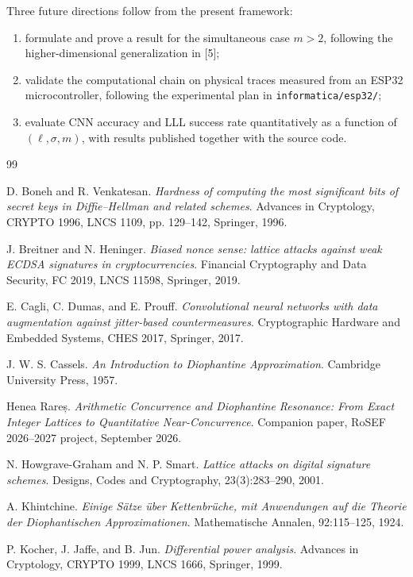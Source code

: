 \documentclass[11pt,a4paper]{article}
\begin{document}
Three future directions follow from the present framework:
\begin{enumerate}[label=(\alph*),leftmargin=2.5em]
\item formulate and prove a result for the simultaneous case $m>2$, following the higher-dimensional generalization in [5];
\item validate the computational chain on physical traces measured from an ESP32 microcontroller, following the experimental plan in \texttt{informatica/esp32/};
\item evaluate CNN accuracy and LLL success rate quantitatively as a function of $(\ell,\sigma,m)$, with results published together with the source code.
\end{enumerate}

\begin{thebibliography}{99}

D. Boneh and R. Venkatesan.
\emph{Hardness of computing the most significant bits of secret keys in Diffie--Hellman and related schemes}.
Advances in Cryptology, CRYPTO 1996, LNCS 1109, pp. 129--142, Springer, 1996.

J. Breitner and N. Heninger.
\emph{Biased nonce sense: lattice attacks against weak ECDSA signatures in cryptocurrencies}.
Financial Cryptography and Data Security, FC 2019, LNCS 11598, Springer, 2019.

E. Cagli, C. Dumas, and E. Prouff.
\emph{Convolutional neural networks with data augmentation against jitter-based countermeasures}.
Cryptographic Hardware and Embedded Systems, CHES 2017, Springer, 2017.

J. W. S. Cassels.
\emph{An Introduction to Diophantine Approximation}.
Cambridge University Press, 1957.

Henea Rareș.
\emph{Arithmetic Concurrence and Diophantine Resonance: From Exact Integer Lattices to Quantitative Near-Concurrence}.
Companion paper, RoSEF 2026--2027 project, September 2026.

N. Howgrave-Graham and N. P. Smart.
\emph{Lattice attacks on digital signature schemes}.
Designs, Codes and Cryptography, 23(3):283--290, 2001.

A. Khintchine.
\emph{Einige Sätze über Kettenbrüche, mit Anwendungen auf die Theorie der Diophantischen Approximationen}.
Mathematische Annalen, 92:115--125, 1924.

P. Kocher, J. Jaffe, and B. Jun.
\emph{Differential power analysis}.
Advances in Cryptology, CRYPTO 1999, LNCS 1666, Springer, 1999.


\end{thebibliography}
\end{document}
